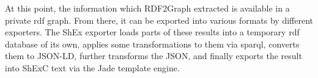 At this point, the information which RDF2Graph extracted is available in a private \gls{rdf} graph.
From there, it can be exported into various formats by different exporters.
The ShEx exporter loads parts of these results into a temporary \gls{rdf} database of its own,
applies some transformations to them via \gls{sparql},
converts them to JSON-LD,
further transforms the JSON,
and finally exports the result into ShExC text via the Jade template engine.
